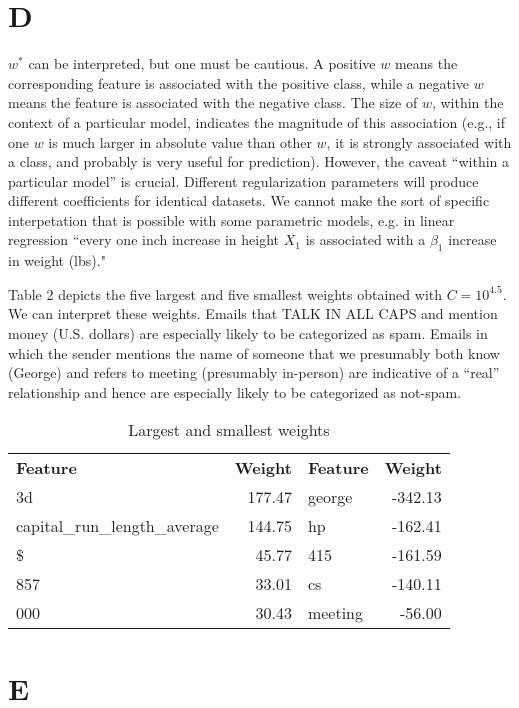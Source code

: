 \documentclass{article}
\begin{document}
\section*{D}

$w^*$ can be interpreted, but one must be cautious. A positive $w$
means the corresponding feature is associated with the positive class, while a
negative $w$ means the feature is associated with the negative class. The size
of $w$, within the context of a particular model, indicates the magnitude of
this association (e.g., if one $w$ is much larger in absolute value than other $w$, it is
strongly associated with a class, and probably is very useful for prediction). 
However, the caveat ``within a particular model'' is
crucial. Different regularization parameters will produce different coefficients
for identical datasets. We cannot make the sort of specific
interpetation that is possible with some parametric models, e.g. in linear
regression ``every one inch increase in height $X_1$ is associated with a $\beta_1$
increase in weight (lbs)."

Table 2 depicts the five largest and five smallest weights obtained with
$C=10^{4.5}$. We can interpret these weights. Emails that TALK IN ALL CAPS and
mention money (U.S. dollars) are especially likely to be categorized as spam.
Emails in which the sender mentions the name of someone that we presumably both
know (George) and refers to meeting
(presumably in-person) are indicative of a ``real'' relationship and hence 
are especially likely to be categorized as not-spam.

\begin{table}[h!]
	\caption{Largest and smallest weights}
	\centering
	\begin{tabular}{|l r | l r|}
		\hline
		\textbf{Feature} & \textbf{Weight} & \textbf{Feature} &
		\textbf{Weight} \\
		3d & 177.47 & george & -342.13 \\
		capital\_run\_length\_average & 144.75 & hp & -162.41 \\
		\$ & 45.77 & 415 & -161.59 \\
		857 & 33.01 & cs & -140.11 \\
		000 & 30.43 & meeting & -56.00 \\
		\hline
	\end{tabular}
\end{table}

\section*{E}
\end{document}
